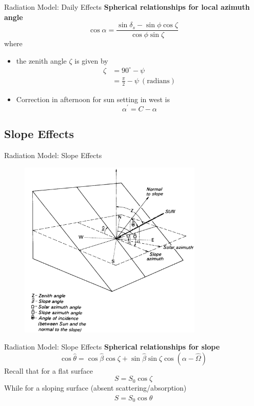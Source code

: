 \begin{frame}{Radiation Model: Daily Effects}
\textbf{Spherical relationships for local azimuth angle}
	$$\cos \alpha = \frac{\sin \delta_s - \sin \phi \cos \zeta}{\cos\phi \sin\zeta}$$
	where 
	\begin{itemize}
	\item the zenith angle $\zeta$ is given by
	\begin{align*}
	\zeta &= 90^\circ - \psi\\
	&= \frac{\pi}{2} - \psi\ (\text{radians})	
	\end{align*}
	\item Correction in afternoon for sun setting in west is
	$$\alpha^\prime = C-\alpha$$
	\end{itemize}
\end{frame}
\subsection{Slope Effects}
\begin{frame}{Radiation Model: Slope Effects}
\begin{figure}
	\includegraphics[width=0.78\textwidth]{fig6}
\end{figure}
\end{frame}
\begin{frame}{Radiation Model: Slope Effects}
\textbf{Spherical relationships for slope}
$$\cos \hat \theta = \cos \hat \beta \cos \zeta + \sin \hat \beta \sin \zeta \cos(\alpha - \hat \Omega)$$
Recall that for a flat surface
$$S=S_0 \cos \zeta$$
While for a sloping surface (absent scattering/absorption)
$$S=S_0 \cos \hat \theta$$
\end{frame}
